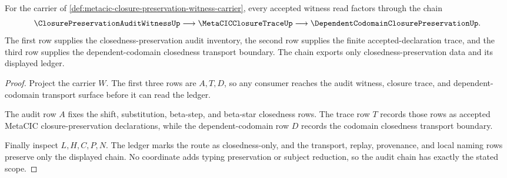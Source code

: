 \begin{theorem}
\label{thm:metacic-closure-preservation-witness-audit-chain}
For the carrier of \autoref{def:metacic-closure-preservation-witness-carrier}, every accepted witness read factors through the chain
$$
\ClosurePreservationAuditWitnessUp \longrightarrow
\MetaCICClosureTraceUp \longrightarrow
\DependentCodomainClosurePreservationUp.
$$
The first row supplies the closedness-preservation audit inventory, the second row supplies the finite accepted-declaration trace, and the third row supplies the dependent-codomain closedness transport boundary. The chain exports only closedness-preservation data and its displayed ledger.
\end{theorem}
\begin{proof}
Project the carrier $W$. The first three rows are $A,T,D$, so any consumer reaches the audit witness, closure trace, and dependent-codomain transport surface before it can read the ledger.

The audit row $A$ fixes the shift, substitution, beta-step, and beta-star closedness rows. The trace row $T$ records those rows as accepted MetaCIC closure-preservation declarations, while the dependent-codomain row $D$ records the codomain closedness transport boundary.

Finally inspect $L,H,C,P,N$. The ledger marks the route as closedness-only, and the transport, replay, provenance, and local naming rows preserve only the displayed chain. No coordinate adds typing preservation or subject reduction, so the audit chain has exactly the stated scope.
\end{proof}

